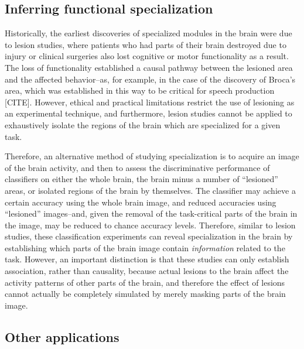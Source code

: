 \subsection{Inferring functional specialization}

Historically, the earliest discoveries
of specialized modules in the brain were due to lesion studies, where
patients who had parts of their brain destroyed due to injury or
clinical surgeries also lost cognitive or motor functionality as a
result.  The loss of functionality established a causal pathway
between the lesioned area and the affected behavior--as, for example,
in the case of the discovery of Broca's area, which was established in
this way to be critical for speech production [CITE].  However,
ethical and practical limitations restrict the use of lesioning as an
experimental technique, and furthermore, lesion studies cannot be
applied to exhaustively isolate the regions of the brain which are
specialized for a given task.

Therefore, an alternative method of studying specialization is to
acquire an image of the brain activity, and then to assess the
discriminative performance of classifiers on either the whole brain,
the brain minus a number of ``lesioned'' areas, or isolated regions of
the brain by themselves.  The classifier may achieve a certain
accuracy using the whole brain image, and reduced accuracies using
``lesioned'' images--and, given the removal of the task-critical parts
of the brain in the image, may be reduced to chance accuracy levels.
Therefore, similar to lesion studies, these classification experiments
can reveal specialization in the brain by establishing which parts of
the brain image contain \emph{information} related to the task.
However, an important distinction is that these studies can only
establish association, rather than causality, because actual lesions
to the brain affect the activity patterns of other parts of the brain,
and therefore the effect of lesions cannot actually be completely
simulated by merely masking parts of the brain image.


\subsection{Other applications}

